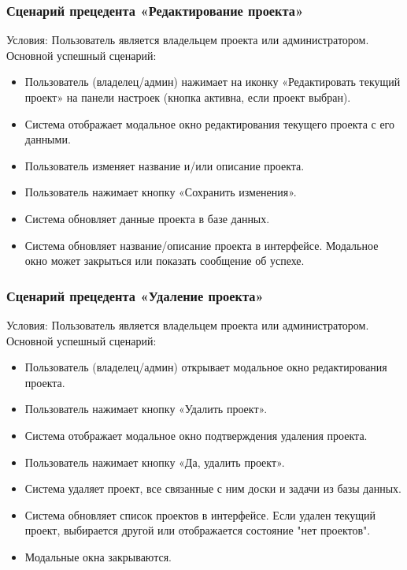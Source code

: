 \subsubsection{Сценарий прецедента «Редактирование проекта»}
Условия: Пользователь является владельцем проекта или администратором.
Основной успешный сценарий:
\begin{itemize}
	\item Пользователь (владелец/админ) нажимает на иконку «Редактировать текущий проект» на панели настроек (кнопка активна, если проект выбран).
	\item Система отображает модальное окно редактирования текущего проекта с его данными.
	\item Пользователь изменяет название и/или описание проекта.
	\item Пользователь нажимает кнопку «Сохранить изменения».
	\item Система обновляет данные проекта в базе данных.
	\item Система обновляет название/описание проекта в интерфейсе. Модальное окно может закрыться или показать сообщение об успехе.
\end{itemize}

\subsubsection{Сценарий прецедента «Удаление проекта»}
Условия: Пользователь является владельцем проекта или администратором.
Основной успешный сценарий:
\begin{itemize}
	\item Пользователь (владелец/админ) открывает модальное окно редактирования проекта.
	\item Пользователь нажимает кнопку «Удалить проект».
	\item Система отображает модальное окно подтверждения удаления проекта.
	\item Пользователь нажимает кнопку «Да, удалить проект».
	\item Система удаляет проект, все связанные с ним доски и задачи из базы данных.
	\item Система обновляет список проектов в интерфейсе. Если удален текущий проект, выбирается другой или отображается состояние "нет проектов".
	\item Модальные окна закрываются.
\end{itemize}

